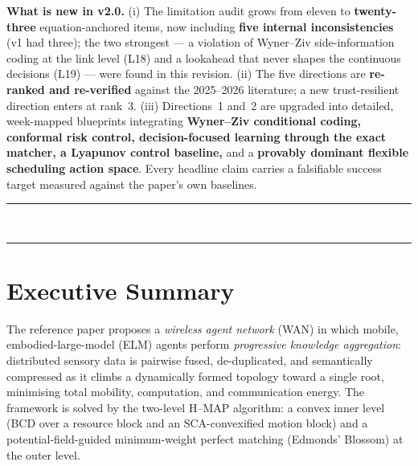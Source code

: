 \documentclass[11pt,a4paper]{article}
\begin{document}
\begin{titlepage}
\begin{center}
\vfill
\begin{tcolorbox}[colback=palegold,colframe=gold,boxrule=0.8pt,arc=2pt,width=0.92\textwidth]
\footnotesize\textbf{What is new in v2.0.}\; (i) The limitation audit grows from eleven to \textbf{twenty-three} equation-anchored items, now including \textbf{five internal inconsistencies} (v1 had three); the two strongest --- a violation of Wyner--Ziv side-information coding at the link level (L18) and a lookahead that never shapes the continuous decisions (L19) --- were found in this revision. (ii) The five directions are \textbf{re-ranked and re-verified} against the 2025--2026 literature; a new trust-resilient direction enters at rank~3. (iii) Directions~1 and~2 are upgraded into detailed, week-mapped blueprints integrating \textbf{Wyner--Ziv conditional coding, conformal risk control, decision-focused learning through the exact matcher, a Lyapunov control baseline,} and a \textbf{provably dominant flexible scheduling action space}. Every headline claim carries a falsifiable success target measured against the paper's own baselines.
\end{tcolorbox}

\vspace{0.5cm}
{\color{accent2}\rule{\textwidth}{0.7pt}}\\[0.3em]
{\color{accent}\rule{\textwidth}{2.2pt}}
\end{center}
\end{titlepage}

\section*{Executive Summary}

The reference paper proposes a \emph{wireless agent network} (WAN) in which mobile, embodied-large-model (ELM) agents perform \emph{progressive knowledge aggregation}: distributed sensory data is pairwise fused, de-duplicated, and semantically compressed as it climbs a dynamically formed topology toward a single root, minimising total mobility, computation, and communication energy. The framework is solved by the two-level \mbox{H--MAP} algorithm: a convex inner level (BCD over a resource block and an SCA-convexified motion block) and a potential-field-guided minimum-weight perfect matching (Edmonds' Blossom) at the outer level.
\end{document}
